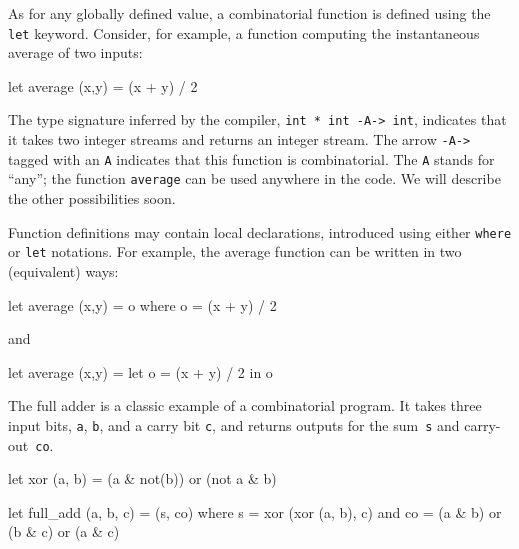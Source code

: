 \documentclass[11pt,titlepage,twoside]{report}
\makeatletter
\newcommand{\zls}[1]{{\@span{class="zelusinline"}#1}}
\newcommand{\zls}[1]{\texttt{#1}}
\renewcommand{\zls}[1]{\texttt{#1}}
\newcommand{\zlsmsg}[1]{\texttt{#1}}
\makeatother
\begin{document}
As for any globally defined value, a combinatorial function
is defined using the \zls{let} keyword.
Consider, for example, a function computing the
instantaneous average of two inputs:
\begin{chklisting}[withresult]
let average (x,y) = (x + y) / 2
\end{chklisting}
The type signature inferred by the compiler, \zlsmsg{int * int -A-> int},
indicates that it takes two integer streams and returns an integer stream.
The arrow \texttt{-A->} tagged with an \texttt{A} indicates that this 
function is combinatorial.
The \texttt{A} stands for ``any''; the function \texttt{average} can be used 
anywhere in the code.
We will describe the other possibilities soon.

Function definitions may contain local declarations, introduced using
either \zls{where} or \zls{let} notations. For example, the average function 
can be written in two (equivalent) ways:
\begin{chklisting}
let average (x,y) = o where o = (x + y) / 2
\end{chklisting}
and
\begin{chklisting}
let average (x,y) = let o = (x + y) / 2 in o
\end{chklisting}

The full adder is a classic example of a combinatorial program.
It takes three input bits, \zls{a}, \zls{b}, and a carry bit \zls{c}, and 
returns outputs for the sum~\zls{s} and carry-out~\zls{co}.
\begin{chklisting}[withresult,label=xor]
let xor (a, b) = (a & not(b)) or (not a & b)

let full_add (a, b, c) = (s, co) where
       s = xor (xor (a, b), c)
   and co = (a & b) or (b & c) or (a & c)
\end{chklisting}
\end{document}
